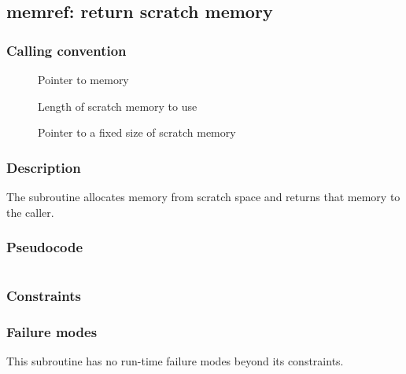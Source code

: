 \clearpage
{}
{}
\label{insn:dummy}
\subsection*{memref: return scratch memory}

\subsubsection*{Calling convention}

\begin{description}
\item[] Pointer to memory
\item[] Length of scratch memory to use
\item[] Pointer to a fixed size of scratch memory
\end{description}

\subsubsection*{Description}

The  subroutine allocates memory from scratch
space and returns that memory to the caller.
\subsubsection*{Pseudocode}

\begin{verbatim}
\end{verbatim}

\subsubsection*{Constraints}

\subsubsection*{Failure modes}

This subroutine has no run-time failure modes beyond its constraints.
